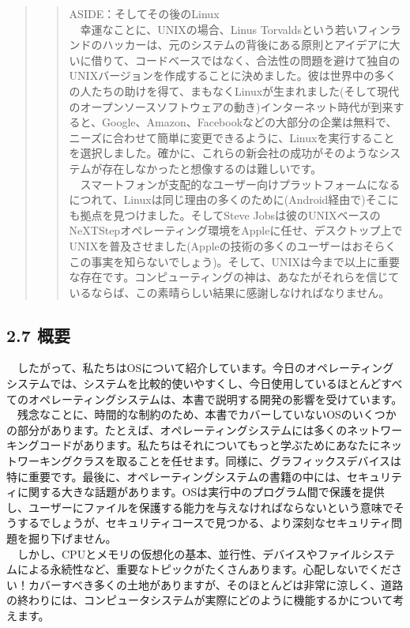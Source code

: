\begin{quote}
\begin{quote}
ASIDE：そしてその後のLinux\\
　幸運なことに、UNIXの場合、Linus
Torvaldsという若いフィンランドのハッカーは、元のシステムの背後にある原則とアイデアに大いに借りて、コードベースではなく、合法性の問題を避けて独自のUNIXバージョンを作成することに決めました。彼は世界中の多くの人たちの助けを得て、まもなくLinuxが生まれました(そして現代のオープンソースソフトウェアの動き)インターネット時代が到来すると、Google、Amazon、Facebookなどの大部分の企業は無料で、ニーズに合わせて簡単に変更できるように、Linuxを実行することを選択しました。確かに、これらの新会社の成功がそのようなシステムが存在しなかったと想像するのは難しいです。\\
　スマートフォンが支配的なユーザー向けプラットフォームになるにつれて、Linuxは同じ理由の多くのために(Android経由で)そこにも拠点を見つけました。そしてSteve
Jobsは彼のUNIXベースのNeXTStepオペレーティング環境をAppleに任せ、デスクトップ上でUNIXを普及させました(Appleの技術の多くのユーザーはおそらくこの事実を知らないでしょう)。そして、UNIXは今まで以上に重要な存在です。コンピューティングの神は、あなたがそれらを信じているならば、この素晴らしい結果に感謝しなければなりません。
\end{quote}
\end{quote}

\hypertarget{ux6982ux8981}{%
\subsection*{2.7 概要}\label{ux6982ux8981}}

　したがって、私たちはOSについて紹介しています。今日のオペレーティングシステムでは、システムを比較的使いやすくし、今日使用しているほとんどすべてのオペレーティングシステムは、本書で説明する開発の影響を受けています。\\
　残念なことに、時間的な制約のため、本書でカバーしていないOSのいくつかの部分があります。たとえば、オペレーティングシステムには多くのネットワーキングコードがあります。私たちはそれについてもっと学ぶためにあなたにネットワーキングクラスを取ることを任せます。同様に、グラフィックスデバイスは特に重要です。最後に、オペレーティングシステムの書籍の中には、セキュリティに関する大きな話題があります。OSは実行中のプログラム間で保護を提供し、ユーザーにファイルを保護する能力を与えなければならないという意味でそうするでしょうが、セキュリティコースで見つかる、より深刻なセキュリティ問題を掘り下げません。\\
　しかし、CPUとメモリの仮想化の基本、並行性、デバイスやファイルシステムによる永続性など、重要なトピックがたくさんあります。心配しないでください！カバーすべき多くの土地がありますが、そのほとんどは非常に涼しく、道路の終わりには、コンピュータシステムが実際にどのように機能するかについて考えます。

